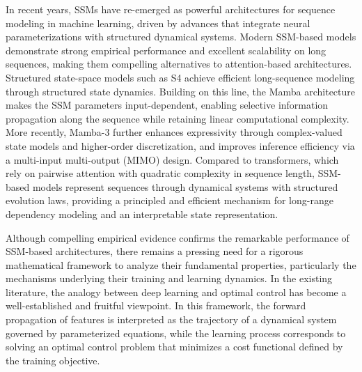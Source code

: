 \documentclass[11pt]{amsart}
\numberwithin{equation}{section} %
\theoremstyle{remark}
\begin{document}
In recent years, SSMs have re-emerged as powerful architectures for sequence modeling in machine learning, driven by advances that integrate neural parameterizations with structured dynamical systems. Modern SSM-based models demonstrate strong empirical performance and excellent scalability on long sequences, making them compelling alternatives to attention-based architectures. 
Structured state-space models such as S4 \cite{gu2021efficiently} achieve efficient long-sequence modeling through structured state dynamics. Building on this line, the Mamba architecture \cite{gu2024mamba} makes the SSM parameters input-dependent, enabling selective information propagation along the sequence while retaining linear computational complexity.
More recently, Mamba-3 \cite{lahoti2026mamba} further enhances expressivity through complex-valued state models and higher-order discretization, and improves inference efficiency via a multi-input multi-output (MIMO) design. Compared to transformers, which rely on pairwise attention with quadratic complexity in sequence length, SSM-based models represent sequences through dynamical systems with structured evolution laws, providing a principled and efficient mechanism for long-range dependency modeling and an interpretable state representation.

Although compelling empirical evidence confirms the remarkable performance of SSM-based architectures, there remains a pressing need for a rigorous mathematical framework to analyze their fundamental properties, particularly the mechanisms underlying their training and learning dynamics. In the existing literature, the analogy between deep learning and optimal control has become a well-established and fruitful viewpoint. In this framework, the forward propagation of features is interpreted as the trajectory of a dynamical system governed by parameterized equations, while the learning process corresponds to solving an optimal control problem that minimizes a cost functional defined by the training objective.
\end{document}
